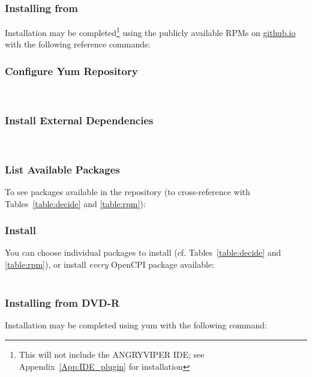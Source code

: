 \subsubsection{Installing from }
Installation may be completed\footnote{This will not include the ANGRYVIPER IDE; see Appendix~\ref{App:IDE_plugin} for installation} using the publicly available RPMs on \href{https://opencpi.github.io/}{github.io} with the following reference commands:
\subsubsection*{Configure Yum Repository}
\\

\subsubsection*{Install External Dependencies}
\\

\subsubsection*{List Available Packages}
To see packages available in the repository (to cross-reference with Tables~\ref{table:decide} and \ref{table:rpm}):\\

\subsubsection*{Install}
You can choose individual packages to install (cf. Tables~\ref{table:decide} and \ref{table:rpm}), or install \textit{every} OpenCPI package available:\\
\\

\subsubsection{Installing from DVD-R}
Installation may be completed using yum with the following command:\\

